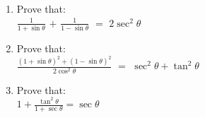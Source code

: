 \documentclass{article}
\begin{document}
 \begin{enumerate}
	 \item Prove that:\\
		 $\frac{1}{1 + \sin\theta}$ $+$ $\frac{1}{1 - \sin\theta}$ $=$ $2\sec^{2}\theta$
	 \item Prove that:\\
		 $\frac{(1 + \sin\theta)^{2} + (1 - \sin\theta)^{2}}{2\cos^{2}\theta}$ $=$ $\sec^{2}\theta + \tan^{2}\theta $
	 \item Prove that:\\
		 $1 + \frac{\tan^{2}\theta}{1 + \sec\theta} = \sec\theta$
 \end{enumerate}
 
\end{document}
